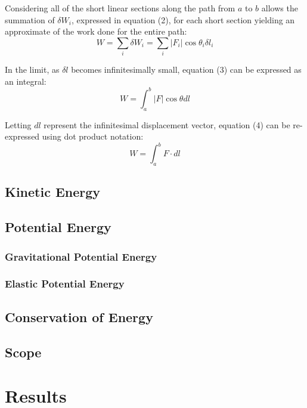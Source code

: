 \documentclass[a4paper]{article}
\begin{document}
Considering all of the short linear sections along the path from $a$ to $b$ allows the summation of $\delta W_i$, expressed in equation (2), for each short section yielding an approximate of the work done for the entire path:
\begin{equation}
W = \sum_{i} \delta W_i = \sum_{i} |F_i| \cos\theta_i \delta l_i
\end{equation}

In the limit, as $\delta l$ becomes infinitesimally small, equation (3) can be expressed as an integral:
\begin{equation}
W = \int_{a}^{b} |F| \cos\theta dl
\end{equation}

Letting $dl$ represent the infinitesimal displacement vector, equation (4) can be re-expressed using dot product notation:
\begin{equation}
W = \int_{a}^{b} F \cdot dl
\end{equation}

\subsection{Kinetic Energy}
 
\subsection{Potential Energy}

\subsubsection{Gravitational Potential Energy}

\subsubsection{Elastic Potential Energy}

\subsection{Conservation of Energy}

\subsection{Scope}

\section{Results}
\end{document}
